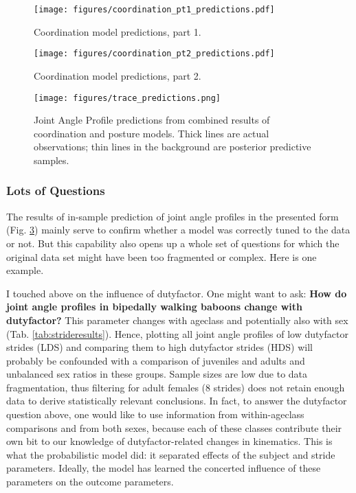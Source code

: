 \begin{figure}[htbp]
\centering
\texttt{[image: figures/coordination\_pt1\_predictions.pdf]}
\caption{\label{fig:coordination1}Coordination model predictions, part 1.}
\end{figure}

\begin{figure}[htbp]
\centering
\texttt{[image: figures/coordination\_pt2\_predictions.pdf]}
\caption{\label{fig:coordination2}Coordination model predictions, part 2.}
\end{figure}


\begin{figure}[htbp]
\centering
\texttt{[image: figures/trace\_predictions.png]}
\caption{\label{fig:japprediction}Joint Angle Profile predictions from combined results of coordination and posture models. Thick lines are actual observations; thin lines in the background are posterior predictive samples.}
\end{figure}


\clearpage
\subsubsection{Lots of Questions}
\label{sec:orgc1e641b}
The results of in-sample prediction of joint angle profiles in the presented form (Fig. \ref{fig:japprediction}) mainly serve to confirm whether a model was correctly tuned to the data or not.
But this capability also opens up a whole set of questions for which the original data set might have been too fragmented or complex.
Here is one example.


I touched above on the influence of dutyfactor.
One might want to ask:
\textbf{How do joint angle profiles in bipedally walking baboons change with dutyfactor?}
This parameter changes with ageclass and potentially also with sex (Tab. \ref{tab:strideresults}).
Hence, plotting all joint angle profiles of low dutyfactor strides (LDS) and comparing them to high dutyfactor strides (HDS) will probably be confounded with a comparison of juveniles and adults and unbalanced sex ratios in these groups.
Sample sizes are low due to data fragmentation, thus filtering for adult females (8 strides) does not retain enough data to derive statistically relevant conclusions.
In fact, to answer the dutyfactor question above, one would like to use information from within-ageclass comparisons and from both sexes, because each of these classes contribute their own bit to our knowledge of dutyfactor-related changes in kinematics.
This is what the probabilistic model did: it separated effects of the subject and stride parameters.
Ideally, the model has learned the concerted influence of these parameters on the outcome parameters.


